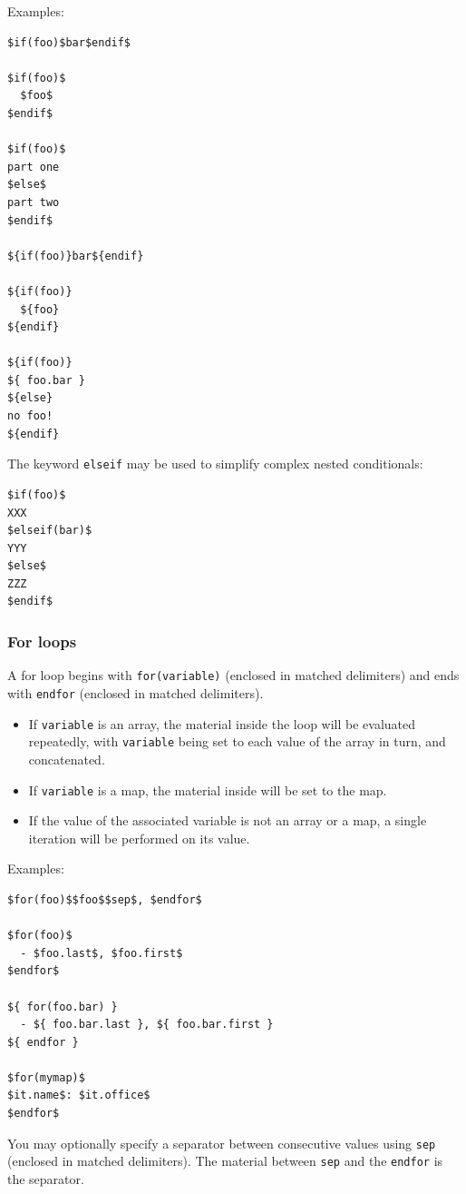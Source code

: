 \documentclass[
]{article}
\providecommand{\tightlist}{%
  \setlength{\itemsep}{0pt}\setlength{\parskip}{0pt}}
\begin{document}
Examples:

\begin{verbatim}
$if(foo)$bar$endif$

$if(foo)$
  $foo$
$endif$

$if(foo)$
part one
$else$
part two
$endif$

${if(foo)}bar${endif}

${if(foo)}
  ${foo}
${endif}

${if(foo)}
${ foo.bar }
${else}
no foo!
${endif}
\end{verbatim}

The keyword \texttt{elseif} may be used to simplify complex nested
conditionals:

\begin{verbatim}
$if(foo)$
XXX
$elseif(bar)$
YYY
$else$
ZZZ
$endif$
\end{verbatim}

\hypertarget{for-loops}{%
\subsubsection{For loops}\label{for-loops}}

A for loop begins with \texttt{for(variable)} (enclosed in matched
delimiters) and ends with \texttt{endfor} (enclosed in matched
delimiters).

\begin{itemize}
\tightlist
\item
  If \texttt{variable} is an array, the material inside the loop will be
  evaluated repeatedly, with \texttt{variable} being set to each value
  of the array in turn, and concatenated.
\item
  If \texttt{variable} is a map, the material inside will be set to the
  map.
\item
  If the value of the associated variable is not an array or a map, a
  single iteration will be performed on its value.
\end{itemize}

Examples:

\begin{verbatim}
$for(foo)$$foo$$sep$, $endfor$

$for(foo)$
  - $foo.last$, $foo.first$
$endfor$

${ for(foo.bar) }
  - ${ foo.bar.last }, ${ foo.bar.first }
${ endfor }

$for(mymap)$
$it.name$: $it.office$
$endfor$
\end{verbatim}

You may optionally specify a separator between consecutive values using
\texttt{sep} (enclosed in matched delimiters). The material between
\texttt{sep} and the \texttt{endfor} is the separator.
\end{document}
